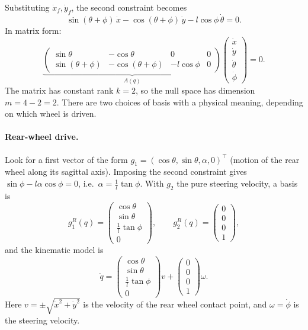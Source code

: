 Substituting \( \dot{x}_f, \dot{y}_f \), the second constraint becomes
\[
\sin(\theta + \phi) \, \dot{x}
- \cos(\theta + \phi) \, \dot{y}
- l \cos\phi \, \dot{\theta} = 0.
\]
In matrix form:
\[
\underbrace{
\begin{pmatrix}
    \sin\theta & -\cos\theta & 0 & 0 \\
    \sin(\theta + \phi) & -\cos(\theta + \phi) & -l\cos\phi & 0
\end{pmatrix}}_{A(q)}
\begin{pmatrix} \dot{x} \\ \dot{y} \\ \dot{\theta} \\ \dot{\phi} \end{pmatrix} = 0.
\]
The matrix has constant rank \( k = 2 \), so the null space has
dimension \( m = 4 - 2 = 2 \). There are two choices of basis with a
physical meaning, depending on which wheel is driven.

\paragraph{Rear-wheel drive.}
Look for a first vector of the form
\( g_1 = (\cos\theta, \sin\theta, \alpha, 0)^\top \) (motion of the rear
wheel along its sagittal axis). Imposing the second constraint gives
\( \sin\phi - l\alpha\cos\phi = 0 \), i.e.\
\( \alpha = \frac{1}{l}\tan\phi \). With \( g_2 \) the pure steering
velocity, a basis is
\[
g_1^R(q) =
\begin{pmatrix}
    \cos\theta \\ \sin\theta \\ \frac{1}{l}\tan\phi \\ 0
\end{pmatrix},
\qquad
g_2^R(q) =
\begin{pmatrix}
    0 \\ 0 \\ 0 \\ 1
\end{pmatrix},
\]
and the kinematic model is
\begin{equation}
\label{eq:bicycle-rear}
    \dot{q} =
    \begin{pmatrix}
        \cos\theta \\ \sin\theta \\ \frac{1}{l}\tan\phi \\ 0
    \end{pmatrix} v
    + \begin{pmatrix} 0 \\ 0 \\ 0 \\ 1 \end{pmatrix} \omega.
\end{equation}
Here \( v = \pm\sqrt{\dot{x}^2 + \dot{y}^2} \) is the velocity of the
rear wheel contact point, and \( \omega = \dot{\phi} \) is the steering
velocity.

